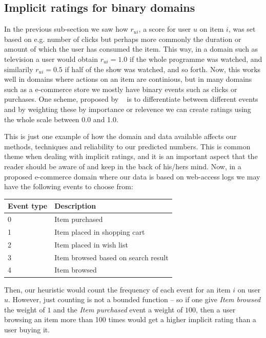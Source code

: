 \subsection{Implicit ratings for binary domains}
\label{implicit-binary-domains}

In the previous sub-section we saw how $r_{ui}$, a score for user $u$ on item
$i$, was set based on e.g. number of clicks but perhaps more commonly the
duration or amount of which the user has consumed the item. This way, in a
domain such as television a user would obtain $r_{ui} = 1.0$ if the whole
programme was watched, and similarily $r_{ui} = 0.5$ if half of the show was
watched, and so forth. Now, this works well in domains where actions on an item
are continious, but in many domains such as a e-commerce store we mostly have
binary events such as clicks or purchases. One scheme, proposed by
~\cite{pkghost2014implicit} is to differentiate between different events and by
weighting these by importance or relevence we can create ratings using the
whole scale between 0.0 and 1.0.

This is just one example of how the domain and data available affects our
methods, techniques and reliability to our predicted numbers. This is common
theme when dealing with implicit ratings, and it is an important aspect that
the reader should be aware of and keep in the back of his/hers mind. Now, in a
proposed e-commerce domain where our data is based on web-access logs we may
have the following events to choose from:

\begin{table}[H]
  \centering
  \begin{tabular}{ll}
  \toprule
  Event type & Description \\ \midrule
  0 & Item purchased \\
  1 & Item placed in shopping cart \\
  2 & Item placed in wish list \\
  3 & Item browsed based on search result \\
  4 & Item browsed \\
  \bottomrule
  \end{tabular}
\end{table}

Then, our heuristic would count the frequency of each event for an item $i$ on
user $u$. However, just counting is not a bounded function -- so if one give
\textit{Item browsed} the weight of $1$ and the \textit{Item purchased} event
a weight of $100$, then a user browsing an item more than 100 times would get a
higher implicit rating than a user buying it.

